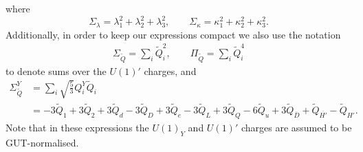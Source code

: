 \documentclass[preprint,amsmath,amssymb,aps,superscriptaddress,prd,showpacs,floatfix,nofootinbib]{revtex4-1}
\begin{document}
where
\begin{equation*}
\Sigma_\lambda=\lambda_1^2+\lambda_2^2+\lambda_3^2, \qquad \Sigma_\kappa=\kappa_1^2+\kappa_2^2+\kappa_3^2.
\end{equation*}
Additionally, in order to keep our expressions compact we also use the notation
\begin{align*}
\Sigma_{\tilde{Q}}=\sum_i \tilde{Q}_i^2, \qquad \Pi_{\tilde{Q}}=\sum_i \tilde{Q}_i^4
\end{align*}
to denote sums over the $U(1)'$ charges, and
\begin{align*}
\Sigma_{\tilde{Q}}^Y&=\sum_i \sqrt{\frac{5}{3}}Q_i^Y\tilde{Q}_i\\
&=-3\tilde{Q}_1+3\tilde{Q}_2+3\tilde{Q}_d-3\tilde{Q}_D+3\tilde{Q}_e-3\tilde{Q}_L+3\tilde{Q}_Q-6\tilde{Q}_u+3\tilde{Q}_{\overline{D}}+\tilde{Q}_{\overline{H'}}-\tilde{Q}_{H'}.
\end{align*}
Note that in these expressions the $U(1)_Y$ and $U(1)'$ charges are assumed to be GUT-normalised.
{}
\end{document}
